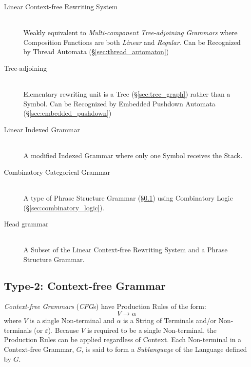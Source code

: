 \begin{description}
\item[Linear Context-free Rewriting System] \hfill \\
  Weakly equivalent to \emph{Multi-component Tree-adjoining Grammars}
  where Composition Functions are both \emph{Linear} and
  \emph{Regular}. Can be Recognized by Thread Automata
  (\S\ref{sec:thread_automaton})\cite{villemonte02}

\item[Tree-adjoining] \hfill \\
  Elementary rewriting unit is a Tree (\S\ref{sec:tree_graph}) rather
  than a Symbol. Can be Recognized by Embedded Pushdown Automata
  (\S\ref{sec:embedded_pushdown})\cite{vijayashanker88}

\item[Linear Indexed Grammar] \hfill \\
  A modified Indexed Grammar where only one Symbol receives the
  Stack.

\item[Combinatory Categorical Grammar] \hfill \\
  A type of Phrase Structure Grammar (\S\ref{sec:context_free}) using
  Combinatory Logic (\S\ref{sec:combinatory_logic}).

\item[Head grammar] \hfill \\
  A Subset of the Linear Context-free Rewriting System and a Phrase
  Structure Grammar.
\end{description}



\subsection{Type-2: Context-free Grammar}\label{sec:context_free}

\emph{Context-free Grammars} (\emph{CFG}s) have Production Rules of
the form:
\[
  V \rightarrow \alpha
\]
where $V$ is a single Non-terminal and $\alpha$ is a String of Terminals
and/or Non-terminals (or $\varepsilon$). Because $V$ is required to be a
single Non-terminal, the Production Rules can be applied regardless of
Context. Each Non-terminal in a Context-free Grammar, $G$, is said to
form a \emph{Sublanguage} of the Language defined by $G$.

